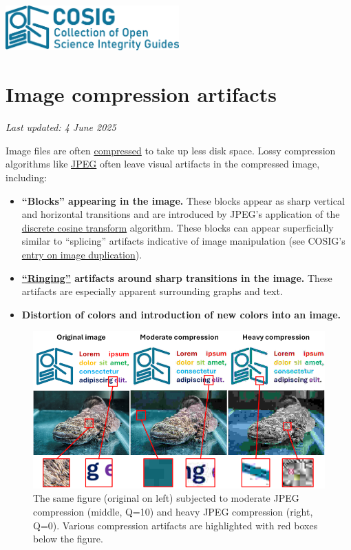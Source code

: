 \documentclass[letterpaper, 12pt]{article}
\begin{document}
\flushleft
\includegraphics[width=0.5\textwidth]{img/home/241017_final_logo_mockup.png}

\section*{Image compression artifacts}
\textit{Last updated: 4 June 2025}

Image files are often \href{https://en.wikipedia.org/wiki/Data_compression}{compressed} to take up less disk space. Lossy compression algorithms like \href{https://en.wikipedia.org/wiki/JPEG}{JPEG} often leave visual artifacts in the compressed image, including:

\begin{itemize}
    \setlength\itemsep{-0.5em}
    \item \textbf{``Blocks'' appearing in the image.} These blocks appear as sharp vertical and horizontal transitions and are introduced by JPEG's application of the \href{https://en.wikipedia.org/wiki/Discrete_cosine_transform}{discrete cosine transform} algorithm. These blocks can appear superficially similar to ``splicing'' artifacts indicative of image manipulation (see COSIG's \href{https://osf.io/547re}{entry on image duplication}).
    \item \textbf{\href{https://en.wikipedia.org/wiki/Ringing_artifacts}{``Ringing''} artifacts around sharp transitions in the image.} These artifacts are especially apparent surrounding graphs and text.
    \item \textbf{Distortion of colors and introduction of new colors into an image.}
\end{itemize}

\begin{figure}[h!tbp]
    \centering
    \includegraphics[width=\textwidth]{img/compression_artifacts/image_compression_fig_small.png}
    \caption*{The same figure (original on left) subjected to moderate JPEG compression (middle, Q=10) and heavy JPEG compression (right, Q=0). Various compression artifacts are highlighted with red boxes below the figure.}
\end{figure}
\end{document}
